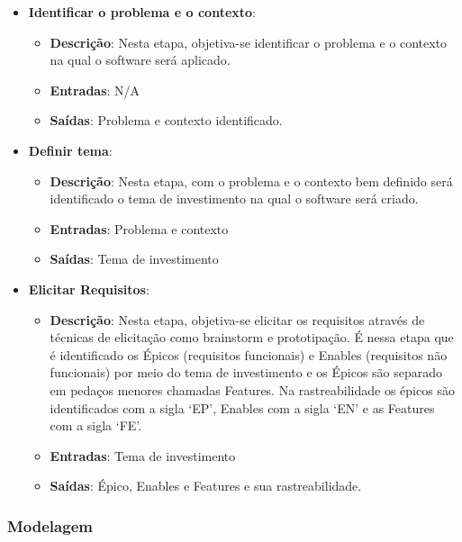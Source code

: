 \begin{itemize}
  \item \textbf{Identificar o problema e o contexto}:
  \begin{itemize}
    \item \textbf{Descrição}: Nesta etapa, objetiva-se identificar o problema e o contexto na qual o software será aplicado.
    \item \textbf{Entradas}: N/A
    \item \textbf{Saídas}: Problema e contexto identificado.
  \end{itemize}
  \item \textbf{Definir tema}:
  \begin{itemize}
    \item \textbf{Descrição}: Nesta etapa, com o problema e o contexto bem definido será identificado o tema
      de investimento na qual o software será criado.
    \item \textbf{Entradas}: Problema e contexto
    \item \textbf{Saídas}: Tema de investimento
  \end{itemize}
  \item \textbf{Elicitar Requisitos}:
  \begin{itemize}
    \item \textbf{Descrição}: Nesta etapa, objetiva-se elicitar os requisitos através de técnicas de elicitação
      como brainstorm e prototipação. É nessa etapa que é identificado os Épicos (requisitos funcionais) e
      Enables (requisitos não funcionais) por meio do tema de investimento e os Épicos são separado em pedaços
      menores chamadas Features. Na rastreabilidade os épicos são identificados com a sigla ‘EP’, Enables com a
      sigla ‘EN’ e as Features com a sigla ‘FE’.
    \item \textbf{Entradas}: Tema de investimento
    \item \textbf{Saídas}: Épico, Enables e Features e sua rastreabilidade.
  \end{itemize}
\end{itemize}

\subsubsection{Modelagem}

